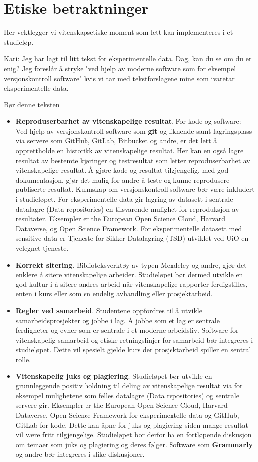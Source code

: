 \documentclass{article}
\begin{document}
\section{Etiske betraktninger}
Her vektlegger vi vitenskapsetiske moment som lett kan implementeres i et studieløp.

{\color{red} Kari: Jeg har lagt til litt tekst for eksperimentelle data. Dag, kan du se om du er enig? Jeg foreslår å stryke "ved hjelp av moderne software som for eksempel versjonskontroll software" hvis vi tar med tekstforslagene mine som ivaretar eksperimentelle data.

Bør denne teksten }
\begin{itemize}
  \item {\bf Reproduserbarhet av vitenskapelige resultat}. For kode og software: Ved hjelp av versjonskontroll software som {\bf git} og liknende samt lagringsplass via servere som GitHub, GitLab, Bitbucket og andre, er det lett å opprettholde en historikk av vitenskapelige resultat. Her kan en også lagre resultat av bestemte kjøringer og testresultat som letter reproduserbarhet av vitenskapelige resultat. Å gjøre kode og resultat tilgjengelig, med god dokumentasjon, gjør det mulig for andre å teste og kunne reprodusere publiserte resultat. Kunnskap om versjonskontroll software bør være inkludert i studieløpet. For eksperimentelle data gir lagring av datasett i sentrale datalagre (Data repositories) en tilsvarende mulighet for reproduksjon av resultater. Eksempler er the European Open Science Cloud, Harvard Dataverse, og Open Science Framework. For eksperimentelle datasett med sensitive data er Tjeneste for Sikker Datalagring (TSD) utviklet ved UiO en velegnet tjeneste. 
  \item {\bf Korrekt sitering}. Biblioteksverktøy  av typen Mendeley og andre, gjør det enklere å sitere vitenskapelige arbeider. Studieløpet bør dermed utvikle en god kultur i å sitere andres arbeid når vitenskapelige rapporter ferdigstilles, enten i kurs eller som en endelig avhandling eller prosjektarbeid.
  \item {\bf Regler ved samarbeid}. Studentene oppfordres til å utvikle samarbeidsprosjekter og jobbe i lag. Å jobbe som et lag er sentrale ferdigheter og evner som er sentrale i et moderne arbeidsliv. Software for vitenskapelig samarbeid og etiske retningslinjer for samarbeid bør integreres i studieløpet. Dette vil spesielt gjelde kurs der prosjektarbeid spiller en sentral rolle.
  \item {\bf Vitenskapelig juks og plagiering}. Studieløpet bør utvikle en grunnleggende positiv holdning til deling av vitenskapelige resultat via for eksempel mulighetene som felles datalagre (Data repositories) og sentrale servere gir. Eksempler er the European Open Science Cloud, Harvard Dataverse, Open Science Framework for eksperimentelle data og GitHub, GitLab for kode. Dette kan åpne for juks og plagiering siden mange resultat vil være fritt tilgjengelige. Studieløpet bor derfor ha en fortløpende diskusjon om temaer som juks og plagiering og deres følger. Software som {\bf Grammarly} og andre bør integreres i slike diskusjoner. 

\end{itemize}
\end{document}
